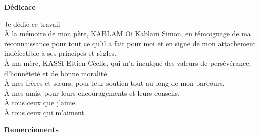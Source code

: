 \begin{center}
	\LARGE{\textbf{Dédicace}}
\end{center}


	Je dédie ce travail\\
	\uppercase{à} la mémoire de mon père, KABLAM Oi Kablam Simon, en témoignage de ma reconnaissance pour tout ce qu’il a fait pour moi et en signe de mon attachement indéfectible à ses principes et règles. \\
	\uppercase{à} ma mère, KASSI Ettien Cécile, qui m'a inculqué des valeurs de persévérance, d'honnêteté et de bonne moralité. \\
	\uppercase{à} mes frères et sœurs, pour leur soutien tout au long de mon parcours.\\
	\uppercase{à} mes amis, pour leurs encouragements et leurs conseils.\\
	\uppercase{à} tous ceux que j'aime.\\
	\uppercase{à} tous ceux qui m'aiment.


\newpage
{}
\begin{center}
	\LARGE{\textbf{Remerciements}}
\end{center}

